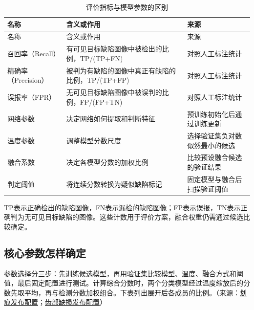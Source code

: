 \begingroup\small{}
\begin{longtable}{@{}>{\raggedright\arraybackslash}p{0.240\dimexpr\linewidth-4\tabcolsep\relax}>{\raggedright\arraybackslash}p{0.340\dimexpr\linewidth-4\tabcolsep\relax}>{\raggedright\arraybackslash}p{0.420\dimexpr\linewidth-4\tabcolsep\relax}@{}}
\caption{评价指标与模型参数的区别}\\
\toprule
名称 & 含义或作用 & 来源 \\
\midrule\endfirsthead
\toprule
名称 & 含义或作用 & 来源 \\
\midrule\endhead
\midrule\multicolumn{3}{r}{\footnotesize 续下页}\endfoot
\bottomrule\endlastfoot
召回率（Recall） & 有可见目标缺陷图像中被检出的比例，TP/(TP+FN) & 对照人工标注统计 \\
精确率（Precision） & 被判为有缺陷的图像中真正有缺陷的比例，TP/(TP+FP) & 对照人工标注统计 \\
误报率（FPR） & 无可见目标缺陷图像中被误判的比例，FP/(FP+TN) & 对照人工标注统计 \\
网络参数 & 决定网络如何提取和判断特征 & 预训练初始化后通过训练更新 \\
温度参数 & 调整模型分数尺度 & 选择验证集负对数似然最小的候选 \\
融合系数 & 决定各模型分数的加权比例 & 比较预设融合候选的验证结果 \\
判定阈值 & 将连续分数转换为疑似缺陷标记 & 固定模型与融合后扫描验证阈值 \\
\end{longtable}\endgroup

TP表示正确检出的缺陷图像，FN表示漏检的缺陷图像；FP表示误报，TN表示正确判为无可见目标缺陷的图像。这些计数用于评价方案，融合权重仍需通过候选比较确定。

\FloatBarrier{}\subsection{核心参数怎样确定}
参数选择分三步：先训练候选模型，再用验证集比较模型、温度、融合方式和阈值，最后固定配置进行测试。计算综合分数时，两个分类模型经过温度缩放后的分数先取平均，再与检测分数加权组合。下表列出展开后各成员的比例。（来源：\protect\hyperlink{source-1}{划痕发布配置}；\protect\hyperlink{source-2}{齿部缺损发布配置}）


